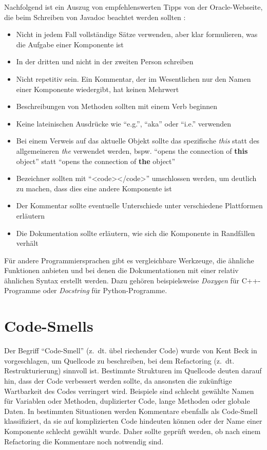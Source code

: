 Nachfolgend ist ein Auszug von empfehlenswerten Tipps von der Oracle-Webseite, die beim Schreiben von Javadoc beachtet werden sollten \cite{HowtoWriteDocCommentsfortheJavadocTool}:
\begin{itemize}
    \item Nicht in jedem Fall vollständige Sätze verwenden, aber klar formulieren, was die Aufgabe einer Komponente ist
    \item In der dritten und nicht in der zweiten Person schreiben
    \item Nicht repetitiv sein. Ein Kommentar, der im Wesentlichen nur den Namen einer Komponente wiedergibt, hat keinen Mehrwert
    \item  Beschreibungen von Methoden sollten mit einem Verb beginnen
    \item Keine lateinischen Ausdrücke wie \enquote{e.g.}, \enquote{aka} oder \enquote{i.e.} verwenden
    \item Bei einem Verweis auf das aktuelle Objekt sollte das spezifische \textit{this} statt des allgemeineren \textit{the} verwendet werden, bspw. \enquote{opens the connection of \textbf{this} object} statt \enquote{opens the connection of \textbf{the} object}
    \item Bezeichner sollten mit \enquote{<code></code>} umschlossen werden, um deutlich zu machen, dass dies eine andere Komponente ist
    \item Der Kommentar sollte eventuelle Unterschiede unter verschiedene Plattformen erläutern
    \item Die Dokumentation sollte erläutern, wie sich die Komponente in Randfällen verhält
    
\end{itemize}

Für andere Programmiersprachen gibt es vergleichbare Werkzeuge, die ähnliche Funktionen anbieten und bei denen die Dokumentationen mit einer relativ ähnlichen Syntax erstellt werden. Dazu gehören beispielsweise \textit{Doxygen} \cite{doxygen} für C++-Programme oder \textit{Docstring} \cite{docstring} für Python-Programme. 
\section{Code-Smells}\label{chapter:code_smell}
Der Begriff \enquote{Code-Smell} (z.~dt. übel riechender Code)  wurde von Kent Beck in \cite[S.~71 ff.]{fowler2019refactoring}  vorgeschlagen, um Quellcode zu beschreiben, bei dem Refactoring (z.~dt. Restrukturierung) sinnvoll ist. Bestimmte Strukturen im Quellcode deuten darauf hin, dass der Code verbessert werden sollte, da ansonsten die zukünftige Wartbarkeit des Codes verringert wird. Beispiele sind schlecht gewählte Namen für Variablen oder Methoden, duplizierter Code, lange Methoden oder globale Daten. In bestimmten Situationen werden Kommentare ebenfalls als Code-Smell klassifiziert, da sie auf komplizierten  Code hindeuten können oder der Name einer Komponente schlecht gewählt wurde. Daher sollte geprüft werden, ob nach einem Refactoring die Kommentare noch notwendig sind.

